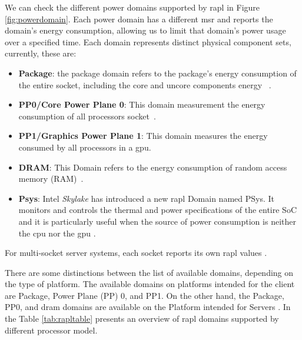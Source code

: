     We can check the different power domains supported by \gls{rapl} in Figure \ref{fig:powerdomain}. Each power domain has a different  \gls{msr}  and reports the domain's energy consumption, allowing us to limit that domain's power usage over a specified time. Each domain represents distinct physical component sets, currently, these are: 
    
    \begin{itemize}
        \item \textbf{Package}: the package domain refers to the package's energy consumption of the entire socket, including the core and uncore components energy ~\cite{intel64and}.
        \item \textbf{PP0/Core Power Plane 0}: This domain measurement the energy consumption of all processors socket~\cite{intel64and,portela2016}.
            \item \textbf{PP1/Graphics Power Plane 1}: This domain measures the energy consumed by all processors in a \gls{gpu}.
        \item \textbf{DRAM}: This Domain refers to the energy consumption of random access memory (RAM)~\cite{intel64and,portela2016}.
        \item \textbf{Psys}: Intel \textit{Skylake} has introduced a new \gls{rapl} Domain named PSys. It monitors and controls the thermal and power specifications of the entire SoC and it is particularly useful when the source of power consumption is neither the \gls{cpu} nor the \gls{gpu} \cite{raplpref}.
    \end{itemize}
    For multi-socket server systems, each socket reports its own \gls{rapl} values \cite{raplpref}.
    
    There are some distinctions between the list of available domains, depending on the type of platform. The available domains on platforms intended for the client are Package, Power Plane (PP) 0, and PP1. On the other hand, the Package, PP0, and \gls{dram} domains are available on the Platform intended for Servers \cite{raplpref2}.
    In the Table \ref{tab:rapltable} presents an overview of \gls{rapl} domains supported by different processor model.


